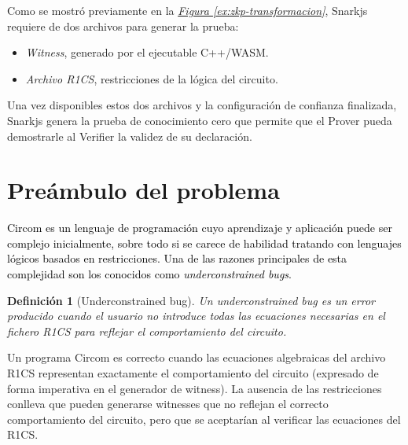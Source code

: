 \documentclass[a4paper,12pt]{report}
\newtheorem{definicion}{Definición}
\begin{document}
	\noindent Como se mostró previamente en la \hyperref[ex:zkp-transformacion]{\textit{Figura \ref{ex:zkp-transformacion}}}, Snarkjs requiere de dos archivos para generar la prueba:
	
	\begin{itemize}
		\item  \textit{Witness}, generado por el ejecutable C++/WASM.
		\item  \textit{Archivo R1CS}, restricciones de la lógica del circuito.
	\end{itemize}
	
	\vspace{0.25cm}
	
	\noindent Una vez disponibles estos dos archivos y la configuración de confianza finalizada, Snarkjs genera la prueba de conocimiento cero que permite que el Prover pueda demostrarle al Verifier la validez de su declaración.
	
	\section{Preámbulo del problema}
	\label{sec:descripcion-problema}
	
	
	\noindent \textcolor{black}{Circom es un lenguaje de programación cuyo aprendizaje y aplicación puede ser complejo inicialmente, sobre todo si se carece de habilidad tratando con lenguajes lógicos basados en restricciones. Una de las razones principales de esta complejidad son los conocidos como \textit{underconstrained bugs}. }
	
	\begin{definicion}[Underconstrained bug]
		\vspace{0.2cm}
		\noindent Un underconstrained bug es un error producido cuando el usuario no introduce todas las ecuaciones necesarias en el fichero R1CS para reflejar el comportamiento del circuito.
		
		\label{def:underconstrained-bug}
	\end{definicion}
	
	\vspace{0.2cm}
	\noindent Un programa Circom  es correcto cuando las ecuaciones algebraicas del archivo R1CS representan exactamente el comportamiento del circuito (expresado de forma imperativa en el generador de witness). La ausencia de las restricciones conlleva que pueden generarse witnesses que no reflejan el correcto comportamiento del circuito, pero que se aceptarían al verificar las ecuaciones del R1CS.
	
\end{document}
